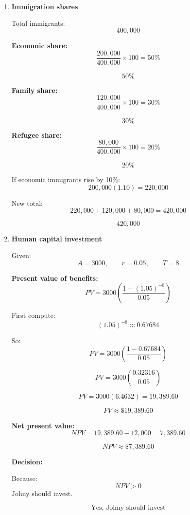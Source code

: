 \documentclass[12pt]{article}
\begin{document}
\begin{enumerate}[label=(\alph*)]
So:
\[
\boxed{\text{Actual employment}=40}
\]


\item \textbf{Immigration shares}

Total immigrants:
\[
400{,}000
\]

\textbf{Economic share:}
\[
\frac{200{,}000}{400{,}000}\times 100=50\%
\]

\[
\boxed{50\%}
\]

\textbf{Family share:}
\[
\frac{120{,}000}{400{,}000}\times 100=30\%
\]

\[
\boxed{30\%}
\]

\textbf{Refugee share:}
\[
\frac{80{,}000}{400{,}000}\times 100=20\%
\]

\[
\boxed{20\%}
\]

If economic immigrants rise by 10\%:
\[
200{,}000(1.10)=220{,}000
\]

New total:
\[
220{,}000+120{,}000+80{,}000=420{,}000
\]

\[
\boxed{420{,}000}
\]


\item \textbf{Human capital investment}

Given:
\[
A=3000,\qquad r=0.05,\qquad T=8
\]

\textbf{Present value of benefits:}
\[
PV=3000\left(\frac{1-(1.05)^{-8}}{0.05}\right)
\]

First compute:
\[
(1.05)^{-8}\approx 0.67684
\]

So:
\[
PV=3000\left(\frac{1-0.67684}{0.05}\right)
\]

\[
PV=3000\left(\frac{0.32316}{0.05}\right)
\]

\[
PV=3000(6.4632)=19{,}389.60
\]

\[
\boxed{PV\approx \$19{,}389.60}
\]

\textbf{Net present value:}
\[
NPV=19{,}389.60-12{,}000=7{,}389.60
\]

\[
\boxed{NPV\approx \$7{,}389.60}
\]

\textbf{Decision:}

Because:
\[
NPV>0
\]
Johny should invest.

\[
\boxed{\text{Yes, Johny should invest}}
\]

\end{enumerate}
\end{document}
